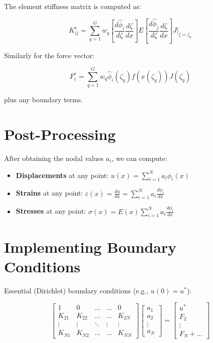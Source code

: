 \documentclass[
  11pt,
  a4paper,
]{scrbook}
\providecommand{\tightlist}{%
  \setlength{\itemsep}{0pt}\setlength{\parskip}{0pt}}\usepackage{longtable,booktabs,array}
\begin{document}
The element stiffness matrix is computed as:

\[K_{ij}^e = \sum_{q=1}^G w_q \left[\frac{d\hat{\phi}_i}{d\zeta}\frac{d\zeta}{dx}\right] E \left[\frac{d\hat{\phi}_j}{d\zeta}\frac{d\zeta}{dx}\right] J \bigg|_{\zeta=\zeta_q}\]

Similarly for the force vector:

\[F_i^e = \sum_{q=1}^G w_q \hat{\phi}_i(\zeta_q) f(x(\zeta_q)) J(\zeta_q)\]

plus any boundary terms.

\section{Post-Processing}\label{post-processing}

After obtaining the nodal values \(a_i\), we can compute:

\begin{itemize}
\tightlist
\item
  \textbf{Displacements} at any point:
  \(u(x) = \sum_{i=1}^N a_i \phi_i(x)\)
\item
  \textbf{Strains} at any point:
  \(\varepsilon(x) = \frac{du}{dx} = \sum_{i=1}^N a_i \frac{d\phi_i}{dx}\)
\item
  \textbf{Stresses} at any point:
  \(\sigma(x) = E(x) \sum_{i=1}^N a_i \frac{d\phi_i}{dx}\)
\end{itemize}

\section{Implementing Boundary
Conditions}\label{implementing-boundary-conditions}

Essential (Dirichlet) boundary conditions (e.g., \(u(0) = u^*\)):

\[\begin{bmatrix}
1 & 0 & \ldots & \ldots & 0 \\
K_{21} & K_{22} & \ldots & \ldots & K_{2N} \\
\vdots & \vdots & \ddots & \vdots & \vdots \\
K_{N1} & K_{N2} & \ldots & \ldots & K_{NN}
\end{bmatrix}
\begin{bmatrix}
a_1 \\ a_2 \\ \vdots \\ a_N
\end{bmatrix}
=
\begin{bmatrix}
u^* \\ F_2 \\ \vdots \\ F_N + \ldots
\end{bmatrix}\]
\end{document}
